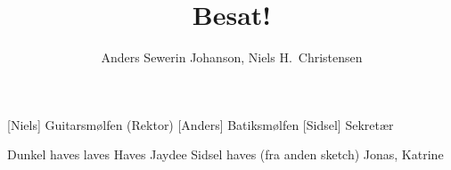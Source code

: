 \documentclass[a4paper,12pt]{article}
\title{Besat!}
\author{Anders Sewerin Johanson, Niels H.\ Christensen}
\begin{document}
\maketitle

\begin{roles}
  [Niels] Guitarsmølfen (Rektor) 
  [Anders] Batiksmølfen
  [Sidsel] Sekretær
\end{roles}

\begin{props}
   Dunkel
   haves
   laves
   Haves
   Jaydee
   Sidsel
   haves (fra anden sketch)
   Jonas, Katrine
\end{props}
\end{document}
